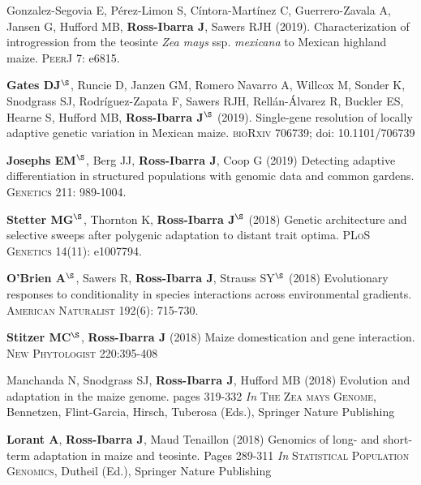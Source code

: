 \documentclass[letterpaper,10pt]{article}
\begin{document}
\begin{etaremune}
\item  Gonzalez-Segovia E,  P\'erez-Limon S,  C\'intora-Mart\'inez C,  Guerrero-Zavala A,  Jansen G,  Hufford MB, \textbf{Ross-Ibarra J}, Sawers RJH (2019). Characterization of introgression from the teosinte \textit{Zea mays} ssp. \textit{mexicana} to Mexican highland maize. \textsc{PeerJ} 7: e6815. %

\item \textbf{Gates DJ}$^\S$, Runcie D, Janzen GM, Romero Navarro A,  Willcox M,  Sonder K, Snodgrass SJ, Rodr\'{i}guez-Zapata F,  Sawers RJH,  Rell\'{a}n-\'{A}lvarez R, Buckler ES, Hearne S, Hufford MB, \textbf{Ross-Ibarra J}$^\S$ (2019). Single-gene resolution of locally adaptive genetic variation in Mexican maize. \textsc{bioRxiv} 706739; doi: 10.1101/706739

\item \textbf{Josephs EM}$^\S$, Berg JJ, \textbf{Ross-Ibarra J}, Coop G (2019) Detecting adaptive differentiation in structured populations with genomic data and common gardens. \textsc{Genetics} 211: 989-1004.

\item \textbf{Stetter MG}$^\S$, Thornton K, \textbf{Ross-Ibarra J}$^\S$ (2018) Genetic architecture and selective sweeps after polygenic adaptation to distant trait optima. \textsc{PLoS Genetics} 14(11): e1007794. %

\item \textbf{O'Brien A}$^\S$, Sawers R, \textbf{Ross-Ibarra J}, Strauss  SY$^\S$ (2018) Evolutionary responses to conditionality in species interactions across environmental gradients. \textsc{American Naturalist} 192(6): 715-730.

\item \textbf{Stitzer MC}$^\S$, \textbf{Ross-Ibarra J} (2018) Maize domestication and gene interaction. \textsc{New Phytologist} 220:395-408

\item Manchanda N, Snodgrass SJ, \textbf{Ross-Ibarra J}, Hufford MB (2018) Evolution and adaptation in the maize genome. pages 319-332 \textit{In} \textsc{The Zea mays Genome}, Bennetzen, Flint-Garcia, Hirsch, Tuberosa (Eds.), Springer Nature Publishing 

\item \textbf{Lorant A}, \textbf{Ross-Ibarra J}, Maud Tenaillon (2018) Genomics of long- and short- term adaptation in maize and teosinte. Pages 289-311 \textit{In} \textsc{Statistical Population Genomics},  Dutheil (Ed.), Springer Nature Publishing 


\end{etaremune}
\end{document}
